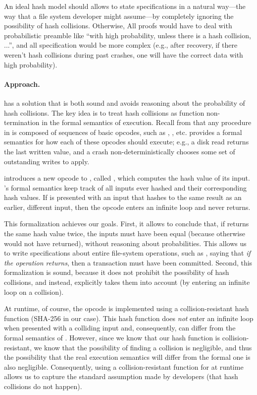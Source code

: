An ideal hash model should allows \sys to state specifications in a natural
way---the way that a file system developer might assume---by completely
ignoring the possibility of hash collisions.  Otherwise, All proofs would
have to deal with probabilistic preamble like ``with high probability,
unless there is a hash collision, ...'', and all specification would be
more complex (e.g., after recovery, if there weren't hash collisions during
past crashes, one will have the correct data with high probability).

\paragraph{Approach.}

\syslog has a solution that is both sound and avoids reasoning about the
probability of hash collisions.  The key idea is to treat hash collisions
as function non-termination in the formal semantics of execution.  Recall
from  that any procedure in \chl is composed of
sequences of basic opcodes, such as , , etc.
\chl provides a formal semantics for how each of these opcodes should
execute; e.g., a disk read returns the last written value, and a crash
non-deterministically chooses some set of outstanding writes to apply.

\syslog introduces a new opcode to \chl, called , which computes
the hash value of its input.  \chl's formal semantics keep track of all
inputs ever hashed and their corresponding hash values.  If  is
presented with an input that hashes to the same result as an earlier,
different input, then the  opcode enters an infinite loop and
never returns.

This formalization achieves our goals.  First, it allows \syslog to
conclude that, if  returns the same hash value twice, the inputs
must have been equal (because otherwise  would not have returned),
without reasoning about probabilities.  This allows us to write
specifications about entire file-system operations, such as ,
saying that \emph{if the operation returns}, then a transaction must have
been committed.  Second, this formalization is sound, because it does not
prohibit the possibility of hash collisions, and instead, explicitly takes
them into account (by entering an infinite loop on a collision).

At runtime, of course, the  opcode is implemented using a
collision-resistant hash function (SHA-256 in our case).  This hash
function does \emph{not} enter an infinite loop when presented with a
colliding input and, consequently, can differ from the formal semantics of
.  However, since we know that our hash function is
collision-resistant, we know that the possibility of finding a collision is
negligible, and thus the possibility that the real execution semantics will
differ from the formal one is also negligible.  Consequently, using a
collision-resistant function for  at runtime allows us to capture
the standard assumption made by developers (that hash collisions do not
happen).

